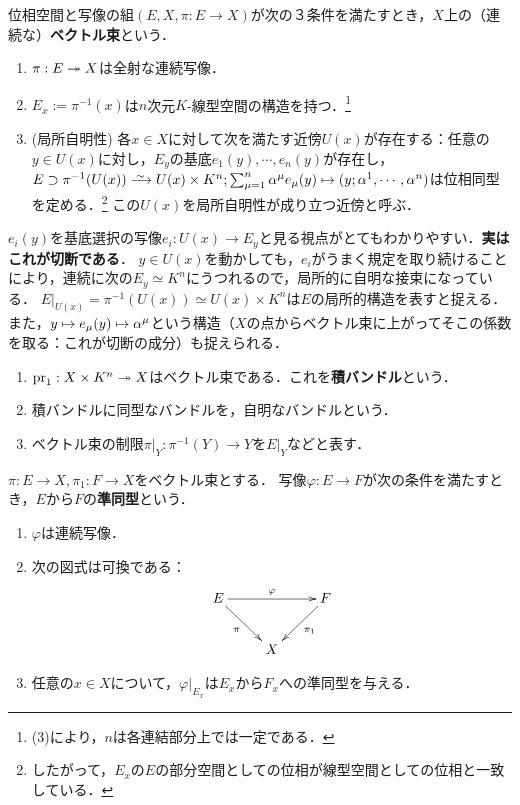 \documentclass[uplatex,dvipdfmx]{jsreport}
\begin{document}
\begin{definition}[ベクトル束]
    位相空間と写像の組$(E,X,\pi:E\to X)$が次の３条件を満たすとき，$X$上の（連続な）\textbf{ベクトル束}という．
    \begin{enumerate}
        \item $\pi:E\twoheadrightarrow X$は全射な連続写像．
        \item $E_x:=\pi^{-1}(x)$は$n$次元$K$-線型空間の構造を持つ．\footnote{(3)により，$n$は各連結部分上では一定である．}
        \item (局所自明性) 各$x\in X$に対して次を満たす近傍$U(x)$が存在する：任意の$y\in U(x)$に対し，$E_y$の基底$e_1(y),\cdots,e_n(y)$が存在し，$E\supset\pi^{-1}(U(x))\iso U(x)\times K^n;\sum^n_{\mu=1}\al^\mu e_\mu(y)\mapsto (y;\al^1,\cdots,\al^n)$は位相同型を定める．\footnote{したがって，$E_x$の$E$の部分空間としての位相が線型空間としての位相と一致している．}
        この$U(x)$を局所自明性が成り立つ近傍と呼ぶ．
    \end{enumerate}
\end{definition}
\begin{remarks}[切断の萌芽]
    $e_i(y)$を基底選択の写像$e_i:U(x)\to E_y$と見る視点がとてもわかりやすい．\textbf{実はこれが切断である}．
    $y\in U(x)$を動かしても，$e_i$がうまく規定を取り続けることにより，連続に次の$E_y\simeq K^n$にうつれるので，局所的に自明な接束になっている．
    $E|_{U(x)}=\pi^{-1}(U(x))\simeq U(x)\times K^n$は$E$の局所的構造を表すと捉える．
    また，$y\mapsto e_\mu(y)\mapsto \alpha^\mu$という構造（$X$の点からベクトル束に上がってそこの係数を取る：これが切断の成分）も捉えられる．
\end{remarks}

\begin{example}\mbox{}
    \begin{enumerate}
        \item $\mathrm{pr}_1:X\times K^n\twoheadrightarrow X$はベクトル束である．これを\textbf{積バンドル}という．
        \item 積バンドルに同型なバンドルを，自明なバンドルという．
        \item ベクトル束の制限$\pi|_Y:\pi^{-1}(Y)\to Y$を$E|_Y$などと表す．
    \end{enumerate}
\end{example}

\begin{definition}[ベクトル束の射]
    $\pi:E\to X,\pi_1:F\to X$をベクトル束とする．
    写像$\varphi:E\to F$が次の条件を満たすとき，$E$から$F$の\textbf{準同型}という．
    \begin{enumerate}
        \item $\varphi$は連続写像．
        \item 次の図式は可換である：
        \[\xymatrix{
            E\ar[rr]^-\varphi\ar[dr]_-\pi&&F\ar[dl]^-{\pi_1}\\
            &X
        }\]
        \item 任意の$x\in X$について，$\varphi|_{E_x}$は$E_x$から$F_x$への準同型を与える．
    \end{enumerate}
\end{definition}
\end{document}
